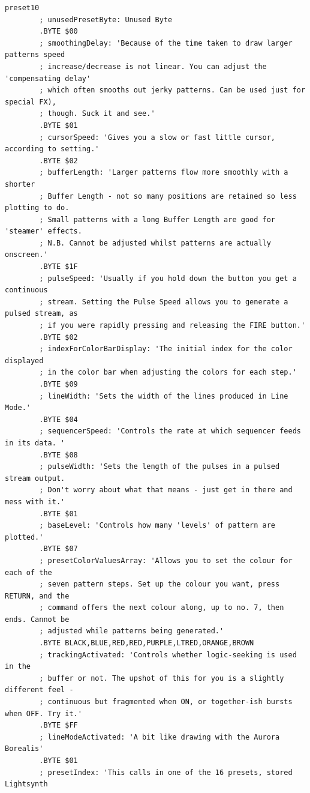 \begin{lstlisting}[basicstyle=\ttfamily\tiny,caption=Source code for Preset 10.]
preset10
        ; unusedPresetByte: Unused Byte
        .BYTE $00
        ; smoothingDelay: 'Because of the time taken to draw larger patterns speed
        ; increase/decrease is not linear. You can adjust the 'compensating delay'
        ; which often smooths out jerky patterns. Can be used just for special FX),
        ; though. Suck it and see.'
        .BYTE $01
        ; cursorSpeed: 'Gives you a slow or fast little cursor, according to setting.'
        .BYTE $02
        ; bufferLength: 'Larger patterns flow more smoothly with a shorter
        ; Buffer Length - not so many positions are retained so less plotting to do.
        ; Small patterns with a long Buffer Length are good for 'steamer' effects.
        ; N.B. Cannot be adjusted whilst patterns are actually onscreen.'
        .BYTE $1F
        ; pulseSpeed: 'Usually if you hold down the button you get a continuous
        ; stream. Setting the Pulse Speed allows you to generate a pulsed stream, as
        ; if you were rapidly pressing and releasing the FIRE button.'
        .BYTE $02
        ; indexForColorBarDisplay: 'The initial index for the color displayed
        ; in the color bar when adjusting the colors for each step.'
        .BYTE $09
        ; lineWidth: 'Sets the width of the lines produced in Line Mode.'
        .BYTE $04
        ; sequencerSpeed: 'Controls the rate at which sequencer feeds in its data. '
        .BYTE $08
        ; pulseWidth: 'Sets the length of the pulses in a pulsed stream output.
        ; Don't worry about what that means - just get in there and mess with it.'
        .BYTE $01
        ; baseLevel: 'Controls how many 'levels' of pattern are plotted.'
        .BYTE $07
        ; presetColorValuesArray: 'Allows you to set the colour for each of the
        ; seven pattern steps. Set up the colour you want, press RETURN, and the
        ; command offers the next colour along, up to no. 7, then ends. Cannot be
        ; adjusted while patterns being generated.'
        .BYTE BLACK,BLUE,RED,RED,PURPLE,LTRED,ORANGE,BROWN
        ; trackingActivated: 'Controls whether logic-seeking is used in the
        ; buffer or not. The upshot of this for you is a slightly different feel -
        ; continuous but fragmented when ON, or together-ish bursts when OFF. Try it.'
        .BYTE $FF
        ; lineModeActivated: 'A bit like drawing with the Aurora Borealis'
        .BYTE $01
        ; presetIndex: 'This calls in one of the 16 presets, stored Lightsynth

\end{lstlisting}
